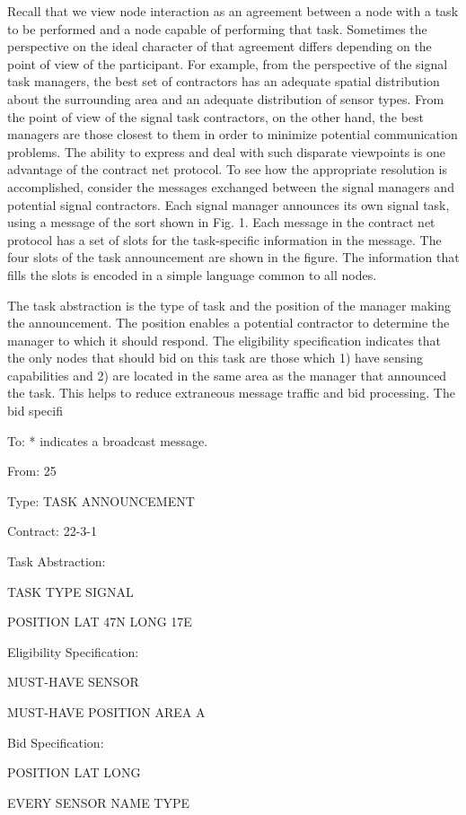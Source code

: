 \documentclass[
]{article}
\begin{document}
Recall that we view node interaction as an agreement between a node with
a task to be performed and a node capable of performing that task.
Sometimes the perspective on the ideal character of that agreement
differs depending on the point of view of the participant. For example,
from the perspective of the signal task managers, the best set of
contractors has an adequate spatial distribution about the surrounding
area and an adequate distribution of sensor types. From the point of
view of the signal task contractors, on the other hand, the best
managers are those closest to them in order to minimize potential
communication problems. The ability to express and deal with such
disparate viewpoints is one advantage of the contract net protocol. To
see how the appropriate resolution is accomplished, consider the
messages exchanged between the signal managers and potential signal
contractors. Each signal manager announces its own signal task, using a
message of the sort shown in Fig. 1. Each message in the contract net
protocol has a set of slots for the task-specific information in the
message. The four slots of the task announcement are shown in the
figure. The information that fills the slots is encoded in a simple
language common to all nodes.

The task abstraction is the type of task and the position of the manager
making the announcement. The position enables a potential contractor to
determine the manager to which it should respond. The eligibility
specification indicates that the only nodes that should bid on this task
are those which 1) have sensing capabilities and 2) are located in the
same area as the manager that announced the task. This helps to reduce
extraneous message traffic and bid processing. The bid specifi

To: * indicates a broadcast message.

From: 25

Type: TASK ANNOUNCEMENT

Contract: 22-3-1

Task Abstraction:

TASK TYPE SIGNAL

POSITION LAT 47N LONG 17E

Eligibility Specification:

MUST-HAVE SENSOR

MUST-HAVE POSITION AREA A

Bid Specification:

POSITION LAT LONG

EVERY SENSOR NAME TYPE
\end{document}
